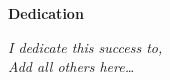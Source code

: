 \pagestyle{plain}
\null\vfil
\begin{center}{\huge{\textbf{Dedication}}}\end{center}
\vspace{0.5cm}
\begin{center}
\large{\textit{
I dedicate this success to,\\
Add all others here\dots}}
\end{center}

\vfil\null
\clearpage

\pagestyle{headings}

